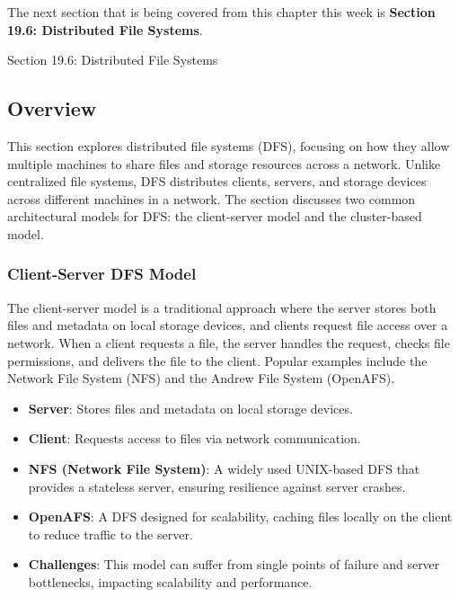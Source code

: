 The next section that is being covered from this chapter this week is \textbf{Section 19.6: Distributed File Systems}.

\begin{notes}{Section 19.6: Distributed File Systems}
    \subsection*{Overview}

    This section explores distributed file systems (DFS), focusing on how they allow multiple machines to share files and storage resources across a network. Unlike centralized file systems, DFS 
    distributes clients, servers, and storage devices across different machines in a network. The section discusses two common architectural models for DFS: the client-server model and the cluster-based model.
    
    \subsubsection*{Client-Server DFS Model}
    
    The client-server model is a traditional approach where the server stores both files and metadata on local storage devices, and clients request file access over a network. When a client requests 
    a file, the server handles the request, checks file permissions, and delivers the file to the client. Popular examples include the Network File System (NFS) and the Andrew File System (OpenAFS).
    
    \begin{highlight}
    
        \begin{itemize}
            \item \textbf{Server}: Stores files and metadata on local storage devices.
            \item \textbf{Client}: Requests access to files via network communication.
            \item \textbf{NFS (Network File System)}: A widely used UNIX-based DFS that provides a stateless server, ensuring resilience against server crashes.
            \item \textbf{OpenAFS}: A DFS designed for scalability, caching files locally on the client to reduce traffic to the server.
            \item \textbf{Challenges}: This model can suffer from single points of failure and server bottlenecks, impacting scalability and performance.
        \end{itemize}
    

\end{highlight}
\end{notes}
